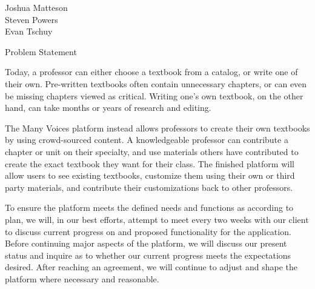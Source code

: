 \documentclass{article}
\begin{document}
    \setlength{\parindent}{0pt}
    \setlength{\parskip}{0pt}
\begingroup\flushleft
  Joshua Matteson\\
  Steven Powers\\
  Evan Tschuy
\endgroup

\setlength{\parindent}{4em}
\linespread{1.1}

\vspace{1pc}
\centerline{\sc \large Problem Statement}
\vspace{2pc}

Today, a professor can either choose a textbook from a catalog, or write one of their own. Pre-written textbooks often contain unnecessary chapters, or can even be missing chapters viewed as critical. Writing one's own textbook, on the other hand, can take months or years of research and editing.

The Many Voices platform instead allows professors to create their own textbooks by using crowd-sourced content. A knowledgeable professor can contribute a chapter or unit on their specialty, and use materials others have contributed to create the exact textbook they want for their class. The finished platform will allow users to see existing textbooks, customize them using their own or third party materials, and contribute their customizations back to other professors.

To ensure the platform meets the defined needs and functions as according to plan, we will, in our best efforts, attempt to meet every two weeks with our client to discuss current progress on and proposed functionality for the application. Before continuing major aspects of the platform, we will discuss our present status and inquire as to whether our current progress meets the expectations desired. After reaching an agreement, we will continue to adjust and shape the platform where necessary and reasonable.
\end{document}
